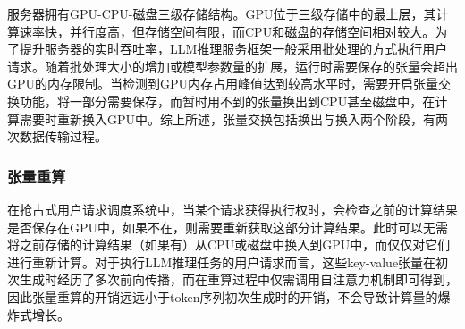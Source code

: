 服务器拥有GPU-CPU-磁盘三级存储结构。GPU位于三级存储中的最上层，其计算速率快，并行度高，但存储空间有限，而CPU和磁盘的存储空间相对较大。为了提升服务器的实时吞吐率，LLM推理服务框架一般采用批处理的方式执行用户请求。随着批处理大小的增加或模型参数量的扩展，运行时需要保存的张量会超出GPU的内存限制。当检测到GPU内存占用峰值达到较高水平时，需要开启张量交换功能，将一部分需要保存，而暂时用不到的张量换出到CPU甚至磁盘中，在计算需要时重新换入GPU中。综上所述，张量交换包括换出与换入两个阶段，有两次数据传输过程。

\subsubsection{张量重算}

在抢占式用户请求调度系统中，当某个请求获得执行权时，会检查之前的计算结果是否保存在GPU中，如果不在，则需要重新获取这部分计算结果。此时可以无需将之前存储的计算结果（如果有）从CPU或磁盘中换入到GPU中，而仅仅对它们进行重新计算。对于执行LLM推理任务的用户请求而言，这些key-value张量在初次生成时经历了多次前向传播，而在重算过程中仅需调用自注意力机制即可得到，因此张量重算的开销远远小于token序列初次生成时的开销，不会导致计算量的爆炸式增长。